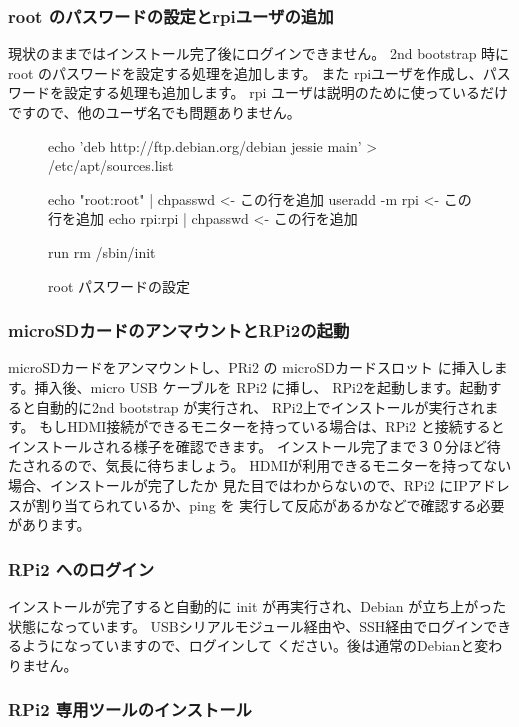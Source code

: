 \documentclass[mingoth,a4paper]{jsarticle}
\begin{document}
\subsubsection{root のパスワードの設定とrpiユーザの追加}

現状のままではインストール完了後にログインできません。
2nd bootstrap 時にroot のパスワードを設定する処理を追加します。
また rpiユーザを作成し、パスワードを設定する処理も追加します。
rpi ユーザは説明のために使っているだけですので、他のユーザ名でも問題ありません。

\begin{figure}[htbp]
\begin{commandline}
echo 'deb http://ftp.debian.org/debian jessie main' > /etc/apt/sources.list

echo "root:root" | chpasswd <- この行を追加
useradd -m rpi <- この行を追加
echo rpi:rpi | chpasswd <- この行を追加

run rm /sbin/init
\end{commandline}
\label{fig:rpiconfig}
\caption{root パスワードの設定}
\end{figure}

\subsubsection{microSDカードのアンマウントとRPi2の起動}

microSDカードをアンマウントし、PRi2 の microSDカードスロット
に挿入します。挿入後、micro USB ケーブルを RPi2 に挿し、
RPi2を起動します。起動すると自動的に2nd bootstrap が実行され、
RPi2上でインストールが実行されます。
もしHDMI接続ができるモニターを持っている場合は、RPi2 と接続すると
インストールされる様子を確認できます。
インストール完了まで３０分ほど待たされるので、気長に待ちましょう。
HDMIが利用できるモニターを持ってない場合、インストールが完了したか
見た目ではわからないので、RPi2 にIPアドレスが割り当てられているか、ping を
実行して反応があるかなどで確認する必要があります。

\subsubsection{RPi2 へのログイン}

インストールが完了すると自動的に init が再実行され、Debian が立ち上がった状態になっています。
USBシリアルモジュール経由や、SSH経由でログインできるようになっていますので、ログインして
ください。後は通常のDebianと変わりません。

\subsubsection{RPi2 専用ツールのインストール}
\end{document}
